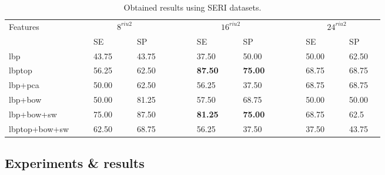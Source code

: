 \begin{tiny}
  \begin{table}[Ht]
\caption{Obtained results using SERI datasets.}%
\centering
\begin{tabular}{lcclcclcccclcclcccclcclc}
\toprule
Features 	& & &\multicolumn{4}{c}{$8^{riu2}$}&	 & & & &\multicolumn{4}{c}{$16^{riu2}$}& & & & &\multicolumn{4}{c}{$24^{riu2}$} &\\
  \cmidrule(l){2-8}  \cmidrule(l){10-16}  \cmidrule(l){18-24}
	       & & & SE & & & SP & & & & & SE & & & SP & & & & & SE & & & SP & \\
\midrule
  	\ac{lbp}					& & & 43.75 & & & 43.75 & & & & & 37.50 & & & 50.00 & & & & & 50.00 & & & 62.50 & \\
 	\ac{lbptop}				& & & 56.25 & & & 62.50 & & & & & \textbf{87.50} & & & \textbf{75.00} & & & & & 68.75 & & & 68.75 & \\
	\ac{lbp}+\ac{pca}		& & & 50.00 & & & 62.50 & & & & & 56.25 & & & 37.50 & & & & & 68.75 & & & 68.75 & \\
	\ac{lbp}+\ac{bow}		& & & 50.00 & & & 81.25 & & & & & 57.50 & & & 68.75 & & & & & 50.00 & & & 50.00 & \\
	\ac{lbp}+\ac{bow}+\acs{sw}		& & & 75.00 & & & 87.50 & & & & & \textbf{81.25} & & & \textbf{75.00} & & & & & 68.75 & & & 62.5 & \\
	\ac{lbptop}+\ac{bow}+\acs{sw}		& & & 62.50 & & & 68.75 & & & & & 56.25 & & & 37.50 & & & & & 37.50 & & & 43.75 & \\
\bottomrule
\end{tabular}
\label{tab:SERI-data}
\end{table}
\end{tiny}

\subsection{Experiments \& results}

